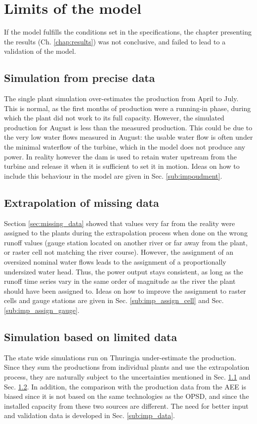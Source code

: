 \section{Limits of the model}
\label{sec:limits}
If the model fulfills the conditions set in the specifications, the chapter presenting the results (Ch. \ref{chap:results}) was not conclusive, and failed to lead to a validation of the model.
\subsection{Simulation from precise data}
\label{sub:lim_single}
The single plant simulation over-estimates the production from April to July. This is normal, as the first months of production were a running-in phase, during which the plant did not work to its full capacity. However, the simulated production for August is less than the measured production. This could be due to the very low water flows measured in August: the usable water flow is often under the minimal waterflow of the turbine, which in the model does not produce any power. In reality however the dam is used to retain water upstream from the turbine and release it when it is sufficient to set it in motion. Ideas on how to include this behaviour in the model are given in Sec. \ref{sub:impoudment}.

\subsection{Extrapolation of missing data}
\label{sub:lim_extra}
Section \ref{sec:missing_data} showed that values very far from the reality were assigned to the plants during the extrapolation process when done on the wrong runoff values (gauge station located on another river or far away from the plant, or raster cell not matching the river course). However, the assignment of an oversized nominal water flows leads to the assignment of a proportionally undersized water head. Thus, the power output stays consistent, as long as the runoff time series vary in the same order of magnitude as the river the plant should have been assigned to. Ideas on how to improve the assignment to raster cells and gauge stations are given in Sec. \ref{sub:imp_assign_cell} and Sec. \ref{sub:imp_assign_gauge}.

\subsection{Simulation based on limited data}
\label{sub:lim_data}
The state wide simulations run on Thuringia under-estimate the production. Since they sum the productions from individual plants and use the extrapolation process, they are naturally subject to the uncertainties mentioned in Sec. \ref{sub:lim_single} and Sec. \ref{sub:lim_extra}. In addition, the comparison with the production data from the AEE is biased since it is not based on the same technologies as the OPSD, and since the installed capacity from these two sources are different. The need for better input and validation data is developed in Sec. \ref{sub:imp_data}.

